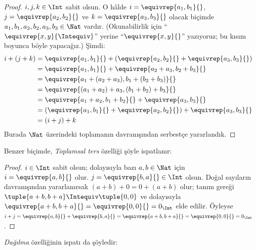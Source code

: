 \documentclass[../../../include/open-logic-section]{subfiles}
\begin{document}
\begin{proof}
$i, j, k \in \Int$ sabit olsun. O hâlde $i = \equivrep{a_1, b_1}{}$,
$j = \equivrep{a_2,b_2}{}$ ve $k = \equivrep{a_3, b_3}{}$ olacak biçimde
$a_1, b_1, a_2, b_2, a_3, b_3 \in \Nat$ vardır. (Okunabilirlik için
“$\equivrep{x, y}{\Intequiv}$” yerine “$\equivrep{x, y}{}$” yazıyoruz;
bu kısım boyunca böyle yapacağız.) Şimdi:
\begin{align*}
	i + (j + k) &= \equivrep{a_1, b_1}{}+(\equivrep{a_2, b_2}{} + \equivrep{a_3, b_3}{}) \\
	&= \equivrep{a_1,  b_1}{} + \equivrep{a_2+a_3, b_2+b_3}{}\\
	&= \equivrep{a_1 + (a_2 + a_3), b_1 + (b_2 + b_3)}{}\\
	&= \equivrep{(a_1 + a_2) + a_3, (b_1 + b_2) + b_3}{}\\
	&= \equivrep{a_1 + a_2, b_1 + b_2}{} + \equivrep{a_3, b_3}{}\\
	&= (\equivrep{a_1, b_1}{} + \equivrep{a_2, b_2}{}) + \equivrep{a_3, b_3}{}\\
	&= (i+j) + k
\end{align*}
Burada $\Nat$ üzerindeki toplamanın davranışından serbestçe yararlandık.
\end{proof}

Benzer biçimde, \emph{Toplamsal ters} özelliği şöyle ispatlanır:

\begin{proof}
$i \in \Int$ sabit olsun; dolayısıyla bazı $a,b \in \Nat$ için
$i = \equivrep{a,b}{}$ olur. $j = \equivrep{b,a}{} \in \Int$ olsun.
Doğal sayıların davranışından yararlanırsak $(a+b) + 0 = 0 + (a+b)$ olur;
tanım gereği $\tuple{a+b, b+a} \Intequiv \tuple{0,0}$ ve dolayısıyla
$\equivrep{a+b, b+a}{} = \equivrep{0, 0}{} = 0_\Int$ elde edilir. Öyleyse
$i + j = \equivrep{a,b}{}+\equivrep{b,a}{}=\equivrep{a+b, b+a}{}
= \equivrep{0, 0}{} = 0_\Int$.
\end{proof}

\emph{Dağılma} özelliğinin ispatı da şöyledir:
\end{document}
